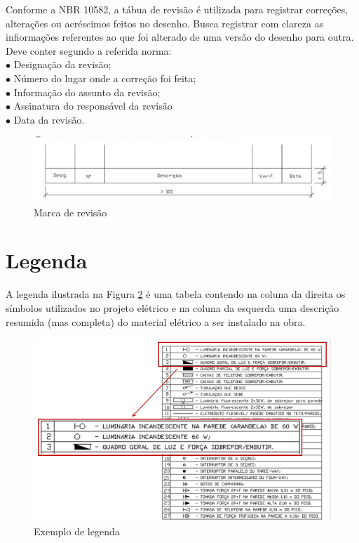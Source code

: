 \documentclass{article}
\begin{document}
\hspace{1cm} Conforme a NBR 10582, a tábua de revisão é utilizada para registrar correções, alterações ou acréscimos feitos no desenho. Busca registrar com clareza as infiormações referentes ao que foi alterado de uma versão do desenho para outra. Deve conter segundo a referida norma:\\
$\bullet$ \hspace{0.1cm} Designação da revisão;\\
$\bullet$ \hspace{0.1cm} Número do lugar onde a correção foi feita;\\
$\bullet$ \hspace{0.1cm} Informação do assunto da revisão;\\
$\bullet$ \hspace{0.1cm} Assinatura do responsável da revisão\\
$\bullet$ \hspace{0.1cm} Data da revisão.\\

\begin{figure} [H] %
\centering
\includegraphics[scale=1]{Fig/Figura_MarcasDeRevisao.png} 
\caption{Marca de revisão}
\label{fig_MarcaDeRevisao}
\end{figure}

\section{Legenda}

\hspace{1cm} A legenda ilustrada na Figura \ref{fig_ExemploLegenda} é uma tabela contendo na coluna da direita os símbolos utilizados no projeto elétrico e na coluna da esquerda uma descrição resumida (mas completa) do material elétrico a ser instalado na obra.

\begin{figure} [H] %
\centering
\includegraphics[scale=0.75]{Fig/Figura_ExemploLegenda.png} 
\caption{Exemplo de legenda}
\label{fig_ExemploLegenda}
\end{figure}
\end{document}
